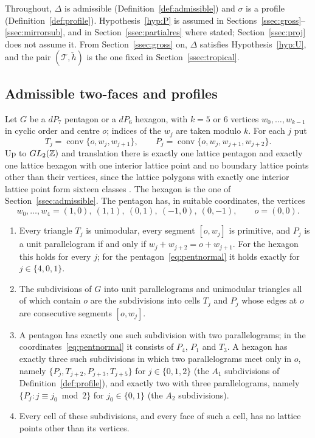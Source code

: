 Throughout, $\Delta$ is admissible (Definition~\ref{def:admissible}) and $\sigma$ is a profile
(Definition~\ref{def:profile}). Hypothesis~\ref{hyp:P} is assumed in Sections~\ref{ssec:gross}--\ref{ssec:mirrorsub},
and in Section~\ref{ssec:partialres} where stated; Section~\ref{ssec:proj} does not assume it. From
Section~\ref{ssec:gross} on, $\Delta$ satisfies Hypothesis~\ref{hyp:U}, and the pair $(\mathcal T,\check h)$ is the one fixed in
Section~\ref{ssec:tropical}.

\subsection{Admissible two-faces and profiles}\label{ssec:faces}
Let $G$ be a $dP_7$ pentagon or a $dP_6$ hexagon, with $k=5$ or $6$ vertices $w_0,\dots,w_{k-1}$ in cyclic order and
centre $o$; indices of the $w_j$ are taken modulo $k$. For each $j$ put
\[
T_j=\operatorname{conv}\{o,w_j,w_{j+1}\},\qquad P_j=\operatorname{conv}\{o,w_j,w_{j+1},w_{j+2}\}.
\]
Up to $GL_2(\mathbb Z)$ and translation there is exactly one lattice pentagon and exactly one lattice hexagon with one
interior lattice point and no boundary lattice points other than their vertices, since the lattice polygons with
exactly one interior lattice point form sixteen classes \cite{PRV00}. The hexagon is the one of
Section~\ref{ssec:admissible}. The pentagon has, in suitable coordinates, the vertices
\begin{equation}\label{eq:pentnormal}
w_0,\dots,w_4=(1,0),\ (1,1),\ (0,1),\ (-1,0),\ (0,-1),\qquad o=(0,0).
\end{equation}

\begin{lemma}\label{lem:subdiv}
\begin{enumerate}
\item Every triangle $T_j$ is unimodular, every segment $[o,w_j]$ is primitive, and $P_j$ is a unit parallelogram if and
only if $w_j+w_{j+2}=o+w_{j+1}$. For the hexagon this holds for every $j$; for the pentagon~\eqref{eq:pentnormal} it holds
exactly for $j\in\{4,0,1\}$.
\item The subdivisions of $G$ into unit parallelograms and unimodular triangles all of which contain $o$ are the
subdivisions into cells $T_j$ and $P_j$ whose edges at $o$ are consecutive segments $[o,w_j]$.
\item A pentagon has exactly one such subdivision with two parallelograms; in the coordinates~\eqref{eq:pentnormal} it
consists of $P_4$, $P_1$ and $T_3$. A hexagon has exactly three such subdivisions in which two parallelograms meet only
in $o$, namely $\{P_j,T_{j+2},P_{j+3},T_{j+5}\}$ for $j\in\{0,1,2\}$ (the $A_1$ subdivisions of
Definition~\ref{def:profile}), and exactly two with three parallelograms, namely $\{P_j:j\equiv j_0\bmod2\}$ for
$j_0\in\{0,1\}$ (the $A_2$ subdivisions).
\item Every cell of these subdivisions, and every face of such a cell, has no lattice points other than its vertices.
\end{enumerate}
\end{lemma}

